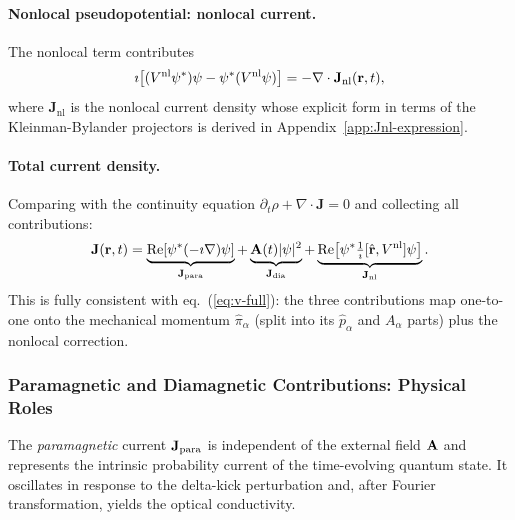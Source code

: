 \paragraph{Nonlocal pseudopotential: nonlocal current.}
The nonlocal term contributes
\begin{equation}
  \imath\!\left[(V^{\mathrm{nl}}\psi^*)\psi - \psi^*(V^{\mathrm{nl}}\psi)\right]
  = -\nabla\cdot\mathbf{J}_\mathrm{nl}(\mathbf{r},t),
  \label{eq:Jnl-continuity}
\end{equation}
where $\mathbf{J}_\mathrm{nl}$ is the nonlocal current density
whose explicit form in terms of the Kleinman-Bylander projectors
is derived in Appendix~\ref{app:Jnl-expression}.

\paragraph{Total current density.}
Comparing with the continuity equation
$\partial_t\rho + \nabla\cdot\mathbf{J} = 0$ and collecting
all contributions:
\begin{equation}
  \mathbf{J}(\mathbf{r},t)
  = \underbrace{
      \operatorname{Re}\!\left[\psi^*(-\imath\nabla)\psi\right]
    }_{\mathbf{J}_{\mathrm{para}}}
  + \underbrace{
      \mathbf{A}(t)|\psi|^2
    }_{\mathbf{J}_{\mathrm{dia}}}
  + \underbrace{
      \operatorname{Re}\!\left[
        \psi^*\tfrac{1}{\imath}[\hat{\mathbf{r}},V^{\mathrm{nl}}]\psi
      \right]
    }_{\mathbf{J}_\mathrm{nl}}.
  \label{eq:J-total}
\end{equation}
This is fully consistent with eq.~(\ref{eq:v-full}): the three
contributions map one-to-one onto the mechanical momentum
$\hat{\pi}_\alpha$ (split into its $\hat{p}_\alpha$ and $A_\alpha$
parts) plus the nonlocal correction.

\subsubsection{Paramagnetic and Diamagnetic Contributions:
  Physical Roles}
\label{sec:para-dia}

The \emph{paramagnetic} current $\mathbf{J}_{\mathrm{para}}$ is independent of the
external field $\mathbf{A}$ and represents the intrinsic probability
current of the time-evolving quantum state.
It oscillates in response to the delta-kick perturbation and, after
Fourier transformation, yields the optical conductivity.

